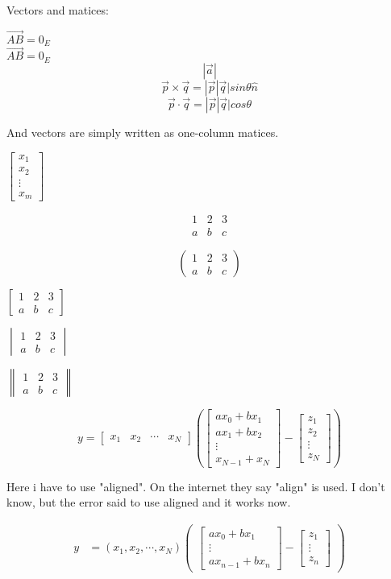 \documentclass[12pt, letterpaper, twoside]{article}    %
\def\A{
\begin{bmatrix}
    x_1 & x_2 & \cdots & x_N
\end{bmatrix}}
\def\B{
\begin{bmatrix}
    ax_0 + bx_1 \\
    ax_1 + bx_2 \\
    \vdots \\
    x_{N-1} + x_N
\end{bmatrix}}
\def\C{
\begin{bmatrix}
    z_1 \\
    z_2 \\
    \vdots \\
    z_N
\end{bmatrix}}
\begin{document}
Vectors and matices:

$\vec{AB} = 0_E$ \\
$\overrightarrow{AB} = 0_E$
$$ \left| \vec{a} \right| $$
$$ \vec{p}\times \vec{q}=|\vec{p}|\vec{q}|sin\theta \hat{n} $$
$$ \vec{p}\cdot\vec{q}=|\vec{p}|\vec{q}|cos\theta $$

And vectors are simply written as one-column matices.

$\begin{bmatrix}
    x_{1} \\
    x_{2} \\
    \vdots \\
	x_{m}
\end{bmatrix}$



\[
\begin{matrix}
1 & 2 & 3\\
a & b & c
\end{matrix}
\]

\[
\begin{pmatrix}
1 & 2 & 3\\
a & b & c
\end{pmatrix}
\]

$\begin{bmatrix}
1 & 2 & 3\\
a & b & c
\end{bmatrix}$

$\begin{vmatrix}
1 & 2 & 3\\
a & b & c
\end{vmatrix}$

$\begin{Vmatrix}
1 & 2 & 3\\
a & b & c
\end{Vmatrix}$








\begin{equation}
y =\A \left( \B - \C \right)
\end{equation}








Here i have to use "aligned". On the internet they say "align" is used.
I don't know, but the error said to use aligned and it works now.

\[
  \begin{aligned}
    y &= (x_{1},x_{2},\cdots, x_{N})
        \begin{pmatrix}
          \begin{bmatrix}
           ax_{0} + bx_{1} \\           
           \vdots \\
           ax_{n-1}+bx_{n}
          \end{bmatrix} -
          \begin{bmatrix}
           z_{1} \\
           \vdots \\
           z_{n}
         \end{bmatrix}
    \end{pmatrix}
  \end{aligned}
\]
\end{document}
